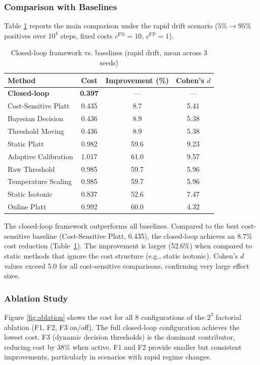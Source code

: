 \documentclass[12pt,a4paper]{article}
\begin{document}
\subsubsection{Comparison with Baselines}

Table \ref{tab:comparison} reports the main comparison under the rapid drift scenario ($5\% \to 95\%$ positives over $10^4$ steps, fixed costs $c^{\text{FN}}=10$, $c^{\text{FP}}=1$).

\begin{table}[t]
\centering
\caption{Closed-loop framework vs. baselines (rapid drift, mean across 3 seeds)}
\label{tab:comparison}
\begin{tabular}{lccc}
\toprule
Method & Cost & Improvement (\%) & Cohen's $d$ \\
\midrule
\textbf{Closed-loop} & \textbf{0.397} & --- & --- \\
Cost-Sensitive Platt & 0.435 & 8.7 & 5.41 \\
Bayesian Decision & 0.436 & 8.9 & 5.38 \\
Threshold Moving & 0.436 & 8.9 & 5.38 \\
Static Platt & 0.982 & 59.6 & 9.23 \\
Adaptive Calibration & 1.017 & 61.0 & 9.57 \\
Raw Threshold & 0.985 & 59.7 & 5.96 \\
Temperature Scaling & 0.985 & 59.7 & 5.96 \\
Static Isotonic & 0.837 & 52.6 & 7.47 \\
Online Platt & 0.992 & 60.0 & 4.32 \\
\end{tabular}
\end{table}

The closed-loop framework outperforms all baselines. Compared to the best cost-sensitive baseline (Cost-Sensitive Platt, 0.435), the closed-loop achieves an 8.7\% cost reduction (Table~\ref{tab:comparison}). The improvement is larger (52.6\%) when compared to static methods that ignore the cost structure (e.g., static isotonic). Cohen's $d$ values exceed 5.0 for all cost-sensitive comparisons, confirming very large effect sizes.

\subsubsection{Ablation Study}

Figure \ref{fig:ablation} shows the cost for all 8 configurations of the $2^3$ factorial ablation (F1, F2, F3 on/off). The full closed-loop configuration achieves the lowest cost. F3 (dynamic decision thresholds) is the dominant contributor, reducing cost by 38\% when active. F1 and F2 provide smaller but consistent improvements, particularly in scenarios with rapid regime changes.
\end{document}
